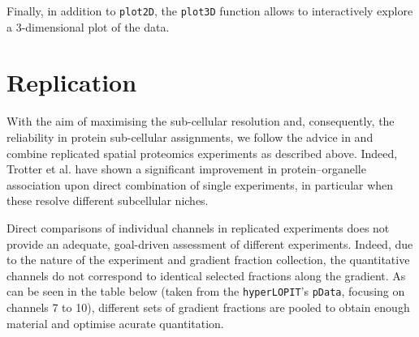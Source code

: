 Finally, in addition to \texttt{plot2D}, the \texttt{plot3D} function
allows to interactively explore a 3-dimensional plot of the data.

\section*{Replication}

With the aim of maximising the sub-cellular resolution and,
consequently, the reliability in protein sub-cellular assignments, we
follow the advice in \cite{Trotter:2010} and combine replicated spatial
proteomics experiments as described above. Indeed, Trotter et
al. have shown a significant improvement in protein–organelle
association upon direct combination of single experiments, in
particular when these resolve different subcellular niches.

Direct comparisons of individual channels in replicated experiments
does not provide an adequate, goal-driven assessment of different
experiments. Indeed, due to the nature of the experiment and gradient fraction
collection, the quantitative channels 
do not correspond to identical selected fractions along the
gradient. As can be seen in the table below (taken from the
\texttt{hyperLOPIT}'s \texttt{pData}, focusing on channels 7 to 10), different sets
of gradient fractions are pooled to obtain enough material and optimise
acurate quantitation.









